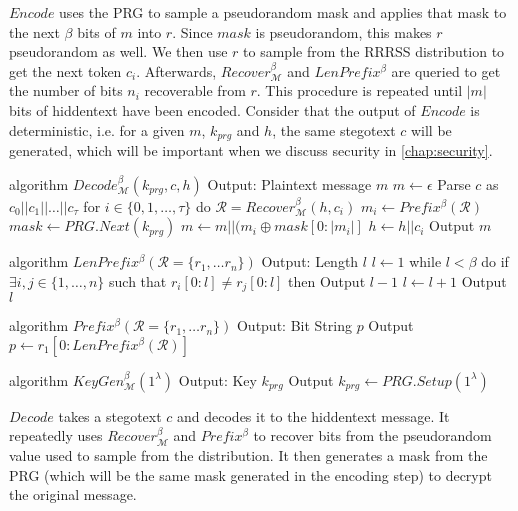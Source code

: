 $Encode$ uses the PRG to sample a pseudorandom mask and applies that mask to the next $\beta$ bits of $m$ into $r$.
Since $mask$ is pseudorandom, this makes $r$ pseudorandom as well.
We then use $r$ to sample from the RRRSS distribution to get the next token $c_i$.
Afterwards, $Recover_{\mathcal{M}}^\beta$ and $LenPrefix^\beta$ are queried to get the number of bits $n_i$ recoverable from $r$.
This procedure is repeated until $|m|$ bits of hiddentext have been encoded.
Consider that the output of $Encode$ is deterministic, i.e. for a given $m$, $k_{prg}$ and $h$, the same stegotext $c$ will be generated, which will be important when we discuss security in \autoref{chap:security}.


\begin{Pseudocode}[float, caption={$Decode$ algorithm \cite{Meteor2021}}, label={alg:decode}]
algorithm $Decode_{\mathcal{M}}^\beta(k_{prg}, c, h)$
  Output: Plaintext message $m$
  $m \leftarrow \epsilon$
  Parse $c$ as $c_0 || c_1 || \dots || c_{\tau}$
  for $i \in \{ 0, 1, \dots, \tau \}$ do
    $\mathcal{R} = Recover_{\mathcal{M}}^\beta(h, c_i)$
    $m_i \leftarrow Prefix^\beta(\mathcal{R})$
    $mask \leftarrow PRG.Next(k_{prg})$
    $m \leftarrow m || (m_i \oplus mask[0: |m_i|]$
    $h \leftarrow h||c_i$
  Output $m$
\end{Pseudocode}

\begin{Pseudocode}[caption={$LenPrefix$ algorithm \cite{Meteor2021}}]
algorithm $LenPrefix^\beta(\mathcal R = \{ r_1, \dots r_n \})$
  Output: Length $l$
  $l \leftarrow 1$
  while $l < \beta$ do
    if $\exists i, j \in \{ 1, \dots, n \}$ such that $r_i[0: l] \neq r_j[0:  l]$ then
      Output $l-1$
    $l \leftarrow l+1$
  Output $l$
\end{Pseudocode}%
%
\begin{Pseudocode}[caption={$Prefix$ algorithm \cite{Meteor2021}}]
algorithm $Prefix^\beta(  \mathcal R = \{ r_1, \dots r_n \})$
  Output: Bit String $p$
  Output $p \leftarrow r_1[0: LenPrefix^\beta(\mathcal{R})]$
\end{Pseudocode}%
%
\begin{Pseudocode}[caption={$KeyGen$ algorithm \cite{Meteor2021}}]
algorithm $KeyGen_{\mathcal{M}}^\beta(1^\lambda)$
  Output: Key $k_{prg}$
  Output $k_{prg} \leftarrow PRG.Setup(1^\lambda)$
\end{Pseudocode}

$Decode$ takes a stegotext $c$ and decodes it to the hiddentext message.
It repeatedly uses $Recover_{\mathcal{M}}^\beta$ and $Prefix^\beta$ to recover bits from the pseudorandom value used to sample from the distribution.
It then generates a mask from the PRG (which will be the same mask generated in the encoding step) to decrypt the original message.

